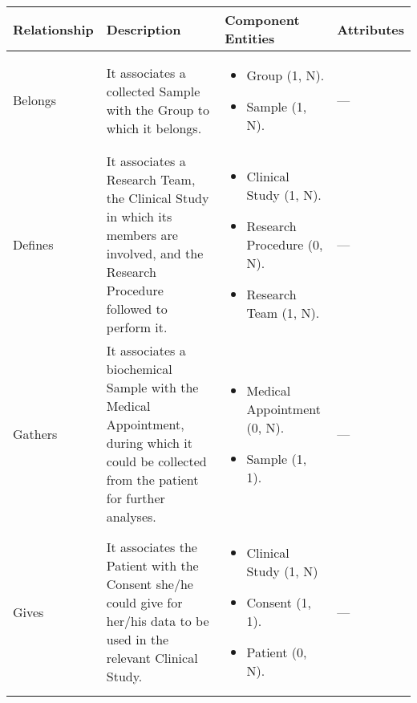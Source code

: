 \begin{longtable}{|p{}|p{} |p{}|p{} |}
\hline
\textbf{Relationship} & \textbf{Description} & \textbf{Component Entities} & \textbf{Attributes} \\\hline


Belongs & It associates a collected Sample with the Group to which it belongs. & \begin{itemize}
        \vspace{-1em}
        \item Group (1, N).
        \item Sample (1, N).
    \end{itemize}
 &  --- \\\hline

 Defines & It associates a Research Team, the Clinical Study in which its members are involved, and the Research Procedure followed to perform it. & \begin{itemize}
        \vspace{-1em}
        \item Clinical Study (1, N).
        \item Research Procedure (0, N).
        \item Research Team (1, N).
    \end{itemize}
 &  --- \\\hline

 Gathers & It associates a biochemical Sample with the Medical Appointment, during which it could be collected from the patient for further analyses. & \begin{itemize}
        \vspace{-1em}
        \item Medical Appointment (0, N).
        \item Sample (1, 1).
    \end{itemize}
 &  --- \\\hline

 Gives & It associates the Patient with the Consent she/he could give for her/his data to be used in the relevant Clinical Study. & \begin{itemize}
        \vspace{-1em}
        \item Clinical Study (1, N)
        \item Consent (1, 1).
        \item Patient (0, N).
    \end{itemize}
 &  --- \\\hline


\end{longtable}

